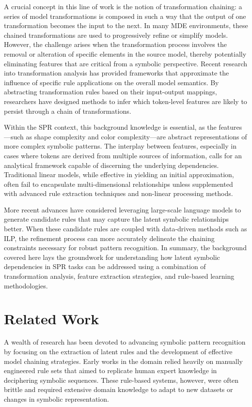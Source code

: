 \documentclass{article}
\begin{document}
A crucial concept in this line of work is the notion of transformation chaining: a series of model transformations is composed in such a way that the output of one transformation becomes the input to the next. In many MDE environments, these chained transformations are used to progressively refine or simplify models. However, the challenge arises when the transformation process involves the removal or alteration of specific elements in the source model, thereby potentially eliminating features that are critical from a symbolic perspective. Recent research into transformation analysis has provided frameworks that approximate the influence of specific rule applications on the overall model semantics. By abstracting transformation rules based on their input-output mappings, researchers have designed methods to infer which token-level features are likely to persist through a chain of transformations.

Within the SPR context, this background knowledge is essential, as the features—such as shape complexity and color complexity—are abstract representations of more complex symbolic patterns. The interplay between features, especially in cases where tokens are derived from multiple sources of information, calls for an analytical framework capable of discerning the underlying dependencies. Traditional linear models, while effective in yielding an initial approximation, often fail to encapsulate multi-dimensional relationships unless supplemented with advanced rule extraction techniques and non-linear processing methods.

More recent advances have considered leveraging large-scale language models to generate candidate rules that may capture the latent symbolic relationships better. When these candidate rules are coupled with data-driven methods such as ILP, the refinement process can more accurately delineate the chaining constraints necessary for robust pattern recognition. In summary, the background covered here lays the groundwork for understanding how latent symbolic dependencies in SPR tasks can be addressed using a combination of transformation analysis, feature extraction strategies, and rule-based learning methodologies.

\section{Related Work}
A wealth of research has been devoted to advancing symbolic pattern recognition by focusing on the extraction of latent rules and the development of effective model chaining strategies. Early works in the domain relied heavily on manually engineered rule sets that aimed to replicate human expert knowledge in deciphering symbolic sequences. These rule-based systems, however, were often brittle and required extensive domain knowledge to adapt to new datasets or changes in symbolic representation.
\end{document}
